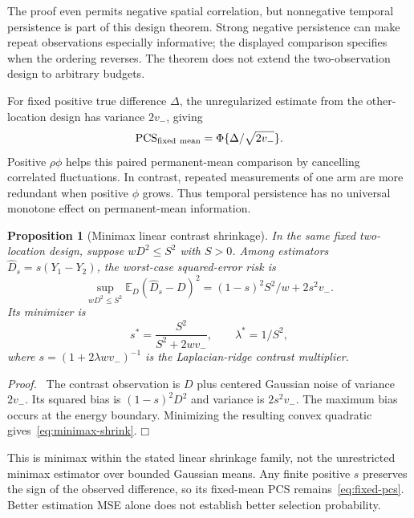 \documentclass[11pt]{article}
\newtheorem{proposition}[theorem]{Proposition}
\newenvironment{proof}{\par\noindent\textit{Proof.}\ }{\hfill$\mdlgwhtsquare$\par\medskip}
\newcommand{\E}{\mathbb E}
\newcommand{\PCS}{\operatorname{PCS}}
\begin{document}
The proof even permits negative spatial correlation, but nonnegative temporal persistence is part of this design theorem. Strong negative persistence can make repeat observations especially informative; the displayed comparison specifies when the ordering reverses. The theorem does not extend the two-observation design to arbitrary budgets.

For fixed positive true difference $\Delta$, the unregularized estimate from the other-location design has variance $2v_-$, giving
\begin{equation}
\PCS_{\rm fixed\ mean}=\Phi\{\Delta/\sqrt{2v_-}\}.
\label{eq:fixed-pcs}
\end{equation}
Positive $\rho\phi$ helps this paired permanent-mean comparison by cancelling correlated fluctuations. In contrast, repeated measurements of one arm are more redundant when positive $\phi$ grows. Thus temporal persistence has no universal monotone effect on permanent-mean information.

\begin{proposition}[Minimax linear contrast shrinkage]
In the same fixed two-location design, suppose $wD^2\le S^2$ with $S>0$. Among estimators $\widehat D_s=s(Y_1-Y_2)$, the worst-case squared-error risk is
\begin{equation}
\sup_{wD^2\le S^2}\E_D(\widehat D_s-D)^2
=(1-s)^2S^2/w+2s^2v_-.
\end{equation}
Its minimizer is
\begin{equation}
\boxed{s^*=\frac{S^2}{S^2+2wv_-},\qquad \lambda^*=1/S^2,}
\label{eq:minimax-shrink}
\end{equation}
where $s=(1+2\lambda wv_-)^{-1}$ is the Laplacian-ridge contrast multiplier.
\end{proposition}
\begin{proof}
The contrast observation is $D$ plus centered Gaussian noise of variance $2v_-$. Its squared bias is $(1-s)^2D^2$ and variance is $2s^2v_-$. The maximum bias occurs at the energy boundary. Minimizing the resulting convex quadratic gives~\eqref{eq:minimax-shrink}.
\end{proof}
This is minimax within the stated linear shrinkage family, not the unrestricted minimax estimator over bounded Gaussian means. Any finite positive $s$ preserves the sign of the observed difference, so its fixed-mean PCS remains~\eqref{eq:fixed-pcs}. Better estimation MSE alone does not establish better selection probability.
\end{document}
